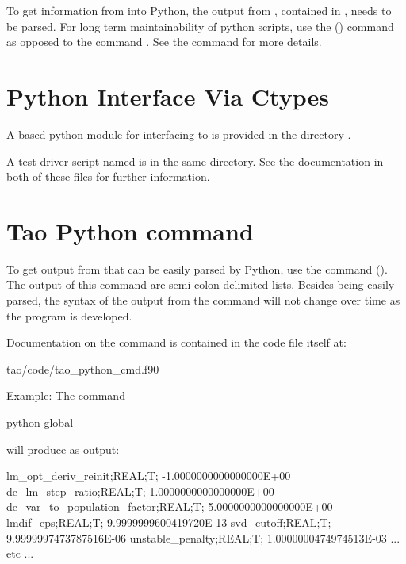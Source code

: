 To get information from \tao into Python, the output from \tao,
contained in , needs to be parsed. For long term
maintainability of python scripts, use the  () command 
as opposed to the  command . See the  command for more details.

\section{Python Interface Via Ctypes}

A  based python module  for interfacing \tao to  is provided in
the directory .

A test driver script named  is in the same directory. See the documentation in both of
these files for further information.

\section{Tao Python command}

To get output from \tao that can be easily parsed by Python, use the  command
(). The output of this command are semi-colon delimited lists. Besides being easily
parsed, the syntax of the output from the  command will not change over time as the \tao
program is developed.

Documentation on the  command is contained in the code file itself at:
\begin{example}
  tao/code/tao_python_cmd.f90
\end{example}

Example: The command
\begin{example}
  python global
\end{example}
will produce as output:
\begin{example}
  lm_opt_deriv_reinit;REAL;T; -1.0000000000000000E+00
  de_lm_step_ratio;REAL;T;  1.0000000000000000E+00
  de_var_to_population_factor;REAL;T;  5.0000000000000000E+00
  lmdif_eps;REAL;T;  9.9999999600419720E-13
  svd_cutoff;REAL;T;  9.9999997473787516E-06
  unstable_penalty;REAL;T;  1.0000000474974513E-03
  ... etc ...
\end{example}


